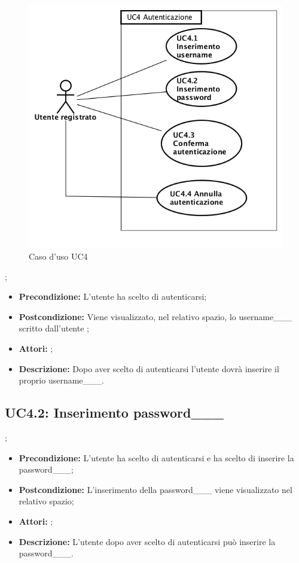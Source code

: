 \begin{figure}[h]
	\begin{center}
	\includegraphics[scale=0.4]{diagram/UC4.png}
	\caption{Caso d'uso UC4}
	\end{center}
\end{figure};
\begin{itemize}
	\item \textbf{Precondizione:} L'utente ha scelto di autenticarsi;
	\item \textbf{Postcondizione:} Viene visualizzato, nel relativo spazio, lo username___ scritto dall'utente ;
	\item \textbf{Attori:} ;
	\item \textbf{Descrizione:} Dopo aver scelto di autenticarsi l'utente dovrà inserire il proprio username___.
\end{itemize}
\subsection{ UC4.2: Inserimento password___}
;
\begin{itemize}
	\item \textbf{Precondizione:} L'utente ha scelto di autenticarsi e ha scelto di inserire la password___;
	\item \textbf{Postcondizione:} L'inserimento della password___ viene visualizzato nel relativo spazio;
	\item \textbf{Attori:} ;
	\item \textbf{Descrizione:} L'utente dopo aver scelto di autenticarsi può inserire la password___.
\end{itemize}
